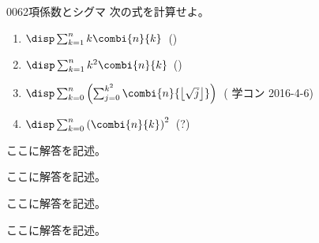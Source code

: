\begin{thm}{006}{}{2項係数とシグマ}
 次の式を計算せよ。
 \begin{enumerate}
  \item $\disp \sum_{k=1}^n k \combi{n}{k}$~()
  \item $\disp \sum_{k=1}^n k^2 \combi{n}{k}$~()
  \item $\disp \sum_{k=0}^n \left(\sum_{j=0}^{k^2} \combi{n}{\left\lfloor \sqrt{j} \right\rfloor}\right)$~( 学コン 2016-4-6)
  \item $\disp \sum_{k=0}^n \left(\combi{n}{k}\right)^2$~(\hosi ?)
 \end{enumerate}
\end{thm}

ここに解答を記述。

ここに解答を記述。

ここに解答を記述。

ここに解答を記述。